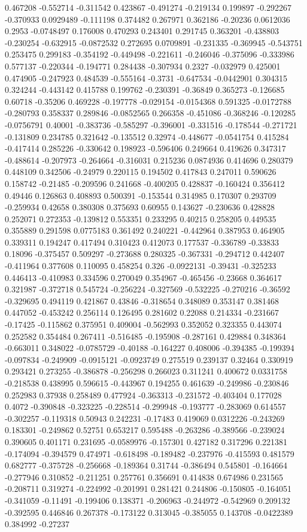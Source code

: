 0.467208 -0.552714 -0.311542 0.423867 -0.491274 -0.219134 0.199897 -0.292267 -0.370933 0.0929489 -0.111198 0.374482 0.267971 0.362186 -0.20236 0.0612036 0.2953 -0.0748497 0.176008 0.470293 0.243401 0.291745 0.363201 -0.438803 -0.230254 -0.632915 -0.0872532 0.272695 0.0709891 -0.231335 -0.369945 -0.543751 0.253475 0.299183 -0.354192 -0.449498 -0.221611 -0.246046 -0.375096 -0.333986 0.577137 -0.220344 -0.194771 0.284438 -0.307934 0.2327 -0.032979 0.425001 0.474905 -0.247923 0.484539 -0.555164 -0.3731 -0.647534 -0.0442901 0.304315 0.324244 -0.443142 0.415788 0.199762 -0.230391 -0.36849 0.365273 -0.126685 0.60718 -0.35206 0.469228 -0.197778 -0.029154 -0.0154368 0.591325 -0.0172788 -0.280793 0.358337 0.289846 -0.0852565 0.266358 -0.451086 -0.368246 -0.120285 -0.0756791 0.40001 -0.383736 -0.585297 -0.396001 -0.331516 -0.178544 -0.271721 -0.131809 0.234785 0.321642 -0.135512 0.32974 -0.448677 -0.0541754 0.415284 -0.417414 0.285226 -0.330642 0.198923 -0.596406 0.249664 0.419626 0.347317 -0.488614 -0.207973 -0.264664 -0.316031 0.215236 0.0874936 0.414696 0.280379 0.448109 0.342506 -0.24979 0.220115 0.194502 0.417843 0.247011 0.590626 0.158742 -0.21485 -0.209596 0.241668 -0.400205 0.428837 -0.160424 0.356412 0.49446 0.126863 0.408893 0.500391 -0.153544 0.314985 0.170307 0.293709 -0.259934 0.42658 0.380308 0.375693 0.60955 0.143627 -0.230636 0.428828 0.252071 0.272353 -0.139812 0.553351 0.233295 0.40215 0.258205 0.449535 0.355889 0.291598 0.0775183 0.361492 0.240221 -0.442964 0.387953 0.464905 0.339311 0.194247 0.417494 0.310423 0.412073 0.177537 -0.336789 -0.33833 0.18096 -0.375457 0.509297 -0.273688 0.280325 -0.367331 -0.294712 0.442407 -0.411964 0.377608 0.110095 0.458254 0.326 -0.0922131 -0.39431 -0.325233 0.446413 -0.410983 0.334596 0.270049 0.354967 -0.465456 -0.23668 0.364617 0.321987 -0.372718 0.545724 -0.256224 -0.327569 -0.532225 -0.270216 -0.36592 -0.329695 0.494119 0.421867 0.43846 -0.318654 0.348089 0.353147 0.381468 0.447052 -0.453242 0.256114 0.126495 0.281602 0.22088 0.214334 -0.231667 -0.17425 -0.115862 0.375951 0.409004 -0.562993 0.352052 0.323355 0.443074 0.252582 0.354484 0.267411 -0.516485 -0.195908 -0.287161 0.429884 0.348364 -0.663011 0.348022 -0.0785729 -0.40188 -0.164227 0.408006 -0.394385 -0.199394 -0.097834 -0.249909 -0.0915121 -0.0923749 0.275519 0.239137 0.32464 0.330919 0.293421 0.273255 -0.386878 -0.256298 0.266023 0.311241 0.400672 0.0331758 -0.218538 0.438995 0.596615 -0.443967 0.194255 0.461639 -0.249986 -0.230846 0.252983 0.37938 0.258489 0.477924 -0.363313 -0.231572 -0.403404 0.177028 0.4072 -0.390848 -0.323225 -0.228514 -0.299948 -0.193777 -0.283069 0.614557 -0.302257 -0.119318 0.50943 0.242231 -0.17483 0.419069 0.0312226 -0.243269 0.183301 -0.249862 0.52751 0.653217 0.595488 -0.263286 -0.389566 -0.239024 0.390605 0.401171 0.231695 -0.0589976 -0.157301 0.427182 0.317296 0.221381 -0.174094 -0.394579 0.474971 -0.618498 -0.189482 -0.237976 -0.415593 0.481579 0.682777 -0.375728 -0.256668 -0.189364 0.31744 -0.386494 0.545801 -0.164664 -0.277946 0.310852 -0.211251 0.257761 0.356691 0.414838 0.674986 0.231565 -0.208711 0.319274 -0.224992 -0.201991 0.281421 0.244806 -0.150805 -0.164051 -0.341059 -0.11491 -0.199406 0.138371 -0.206963 -0.244972 -0.542969 0.209132 -0.392595 0.446846 0.267378 -0.173122 0.313045 -0.385055 0.143708 -0.0422389 0.384992 -0.27237 